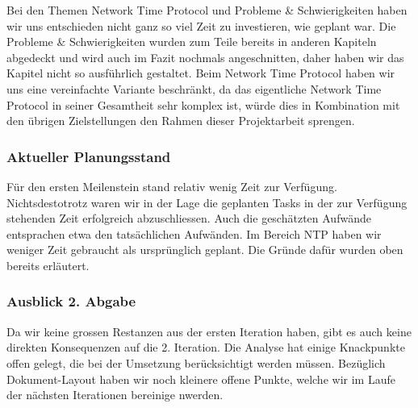 Bei den Themen Network Time Protocol und Probleme \& Schwierigkeiten haben wir uns entschieden nicht ganz so viel Zeit zu investieren, wie geplant war. Die Probleme \& Schwierigkeiten wurden zum Teile bereits in anderen Kapiteln abgedeckt und wird auch im Fazit nochmals angeschnitten, daher haben wir das Kapitel nicht so ausführlich gestaltet. Beim Network Time Protocol haben wir uns eine vereinfachte Variante beschränkt, da das eigentliche Network Time Protocol in seiner Gesamtheit sehr komplex ist, würde dies in Kombination mit den übrigen Zielstellungen den Rahmen dieser Projektarbeit sprengen.

\subsubsection{Aktueller Planungsstand}
Für den ersten Meilenstein stand relativ wenig Zeit zur Verfügung. Nichtsdestotrotz waren wir in der Lage die geplanten Tasks in der zur Verfügung stehenden Zeit erfolgreich abzuschliessen. Auch die geschätzten Aufwände entsprachen etwa den tatsächlichen Aufwänden. Im Bereich NTP haben wir weniger Zeit gebraucht als ursprünglich geplant. Die Gründe dafür wurden oben bereits erläutert.

\subsubsection{Ausblick 2. Abgabe}
Da wir keine grossen Restanzen aus der ersten Iteration haben, gibt es auch keine direkten Konsequenzen auf die 2. Iteration. Die Analyse hat einige Knackpunkte offen gelegt, die bei der Umsetzung berücksichtigt werden müssen. Bezüglich Dokument-Layout haben wir noch kleinere offene Punkte, welche wir im Laufe der nächsten Iterationen bereinige nwerden.
